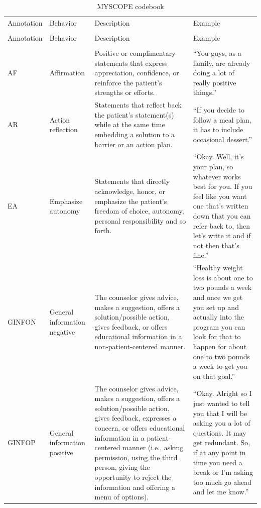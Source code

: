 \begin{small}
\begin{longtable}{p{1.3cm}p{2cm}p{5cm}p{4.8cm}}
\caption{MYSCOPE codebook} 
\label{tab:codebook} \\
\hline\noalign{\smallskip}
Annotation & Behavior & Description & Example \\ 
\noalign{\smallskip}\hline\noalign{\smallskip}
\endfirsthead
\multicolumn{4}{@{}l}{\textbf{Table\ref{tab:codebook}} (continued)} \\ 
\noalign{\smallskip}\hline\noalign{\smallskip}
Annotation & Behavior & Description & Example \\
\noalign{\smallskip}\hline\noalign{\smallskip}
\endhead

\rowcolor{lightgraycol}
\noalign{\smallskip}
\multicolumn{4}{l}{\textbf{Counselor}} \\
\noalign{\smallskip}
AF & Affirmation & Positive or complimentary statements that express appreciation, confidence, or reinforce the patient's strengths or efforts. & ``You guys, as a family, are already doing a lot of really positive things.'' \\
AR & Action reflection & Statements that reflect back the patient's statement(s) while at the same time embedding a solution to a barrier or an action plan. & ``If you decide to follow a meal plan, it has to include occasional dessert.'' \\
EA & Emphasize autonomy & Statements that directly acknowledge, honor, or emphasize the patient's freedom of choice, autonomy, personal responsibility and so forth. & ``Okay. Well, it's your plan, so whatever works best for you. If you feel like you want one that's written down that you can refer back to, then let's write it and if not then that's fine.''\\
GINFON & General information negative & The counselor gives advice, makes a suggestion, offers a solution/possible action, gives feedback, or offers educational information in a non-patient-centered manner. & ``Healthy weight loss is about one to two pounds a week and once we get you set up and actually into the program you can look for that to happen for about one to two pounds a week to get you on that goal.''\\
GINFOP & General information positive & The counselor gives advice, makes a suggestion, offers a solution/possible action, gives feedback, expresses a concern, or offers educational information in a patient-centered manner (i.e., asking permission, using the third person, giving the opportunity to reject the information and offering a menu of options). & ``Okay.  Alright so I just wanted to tell you that I will be asking you a lot of questions.  It may get redundant.  So, if at any point in time you need a break or I'm asking too much go ahead and let me know.''\\

\end{longtable}
\end{small}
